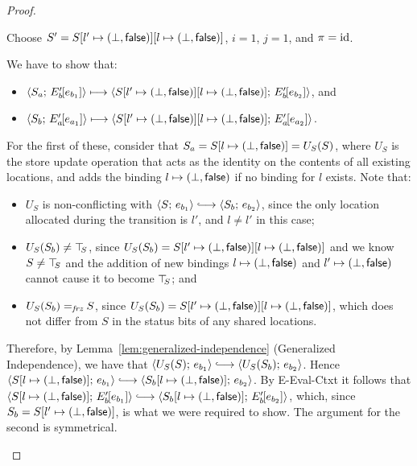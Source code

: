 \begin{proof}
\begin{enumerate}
\begin{enumerate}
\begin{itemize}
          Choose $S' =
          S[l' \mapsto (\bot, \textsf{false})][l \mapsto (\bot, \textsf{false})]$,
          $i = 1$, $j = 1$, and $\pi = \mathrm{id}$.

          We have to show that:
          \begin{itemize}
          \item
            $\langle S_a;\, E'_b\hspace{-1mm}\left[e_{b_1}\right] \rangle \longmapsto
            \langle S[l' \mapsto (\bot, \textsf{false})][l \mapsto (\bot, \textsf{false})];\, E'_b\hspace{-1mm}\left[e_{b_2}\right] \rangle$,
            and
          \item
            $\langle S_b;\, E'_a\hspace{-1mm}\left[e_{a_1}\right] \rangle \longmapsto
            \langle S[l' \mapsto (\bot, \textsf{false})][l \mapsto (\bot, \textsf{false})];\, E'_a\hspace{-1mm}\left[e_{a_2}\right] \rangle$.
          \end{itemize}

          For the first of these, consider that $S_a =
          S[l \mapsto (\bot, \textsf{false})] = U_S(S)$, where $U_S$ is
          the store update operation that acts as the identity on the
          contents of all existing locations, and adds the binding
          $l \mapsto (\bot, \textsf{false})$ if no binding for $l$
          exists.  Note that:
          \begin{itemize}
          \item $U_S$ is non-conflicting with $\config{S}{e_{b_1}}
            \parstepsto \config{S_b}{e_{b_2}}$, since the only
            location allocated during the transition is $l'$, and $l
            \neq l'$ in this case;
          \item $U_S(S_b) \neq \top\hspace{-0.85mm}_{S}$, since $U_S(S_b) =
            S[l' \mapsto (\bot, \textsf{false})][l \mapsto (\bot, \textsf{false})]$
            and we know $S \neq \top\hspace{-0.85mm}_{S}$ and the addition of new
            bindings $l \mapsto (\bot, \textsf{false})$ and
            $l' \mapsto (\bot, \textsf{false})$ cannot cause it to
            become $\top\hspace{-0.85mm}_{S}$; and
          \item $U_S(S_b) =_{\textit{frz}} S$, since $U_S(S_b) =
            S[l' \mapsto (\bot, \textsf{false})][l \mapsto (\bot, \textsf{false})]$,
            which does not differ from $S$ in the status bits of any
            shared locations.
          \end{itemize}

          Therefore, by Lemma~\ref{lem:generalized-independence}
          (Generalized Independence), we have that
          $\config{U_S(S)}{e_{b_1}} \parstepsto
          \config{U_S(S_b)}{e_{b_2}}$.  Hence
          $\config{\extS{S}{l}{\bot}{\frozenfalse}}{e_{b_1}}
          \parstepsto
          \config{\extS{S_b}{l}{\bot}{\frozenfalse}}{e_{b_2}}$.  By
                 {\sc E-Eval-Ctxt} it follows that
                 $\config{\extS{S}{l}{\bot}{\frozenfalse}}{\evalctxt{E'_b}{e_{b_1}}}
                 \parstepsto
                 \config{\extS{S_b}{l}{\bot}{\frozenfalse}}{\evalctxt{E'_b}{e_{b_2}}}$,
                 which, since $S_b =
                 S[l' \mapsto (\bot, \textsf{false})]$, is what we were
                 required to show.  The argument for the second is
                 symmetrical.


\end{itemize}
\end{enumerate}
\end{enumerate}
\end{proof}
